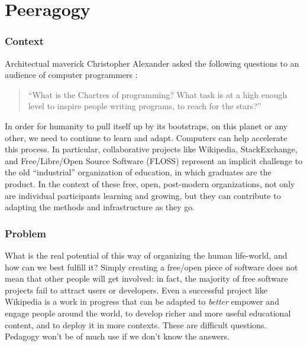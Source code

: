\section{Peeragogy}\label{sec:Peeragogy_Project}

\subsubsection*{Context}  Architectual maverick Christopher Alexander asked the following questions to an audience of computer programmers \cite{alexander1999origins}: 
\begin{quote}
``What is the Chartres of programming? What task is at a high enough level to inspire people writing programs, to reach for the stars?''
\end{quote}
In order for humanity to pull itself up by its bootstraps, on this planet or any other, we need to continue to learn and adapt.  Computers can help accelerate this process.  In particular, collaborative projects like Wikipedia, StackExchange, and Free/Libre/Open Source Software (FLOSS) represent an implicit challenge to the old ``industrial'' organization of education, in which graduates are the product.  In the context of these free, open, post-modern organizations, not only are individual participants learning and growing, but they can contribute to adapting the methods and infrastructure as they go.

\subsubsection*{Problem} What is the real potential of this way of organizing the human life-world, and how can we best fulfill it?  Simply creating a free/open piece of software does not mean that other people will get involved: in fact, the majority of free software projects fail to attract users or developers.  Even a successful project like Wikipedia is a work in progress that can be adapted to \emph{better} empower and engage people around the world, to develop richer and more useful educational content, and to deploy it in more contexts.  These are difficult questions.  Pedagogy won't be of much use if we don't know the answers.

